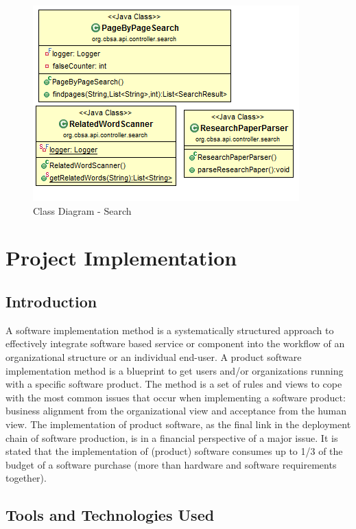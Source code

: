 \documentclass[oneside,a4paper,12pt]{report}
\begin{document}
{\begin{figure}[H]
\includegraphics{class-dig-search}
\caption{Class Diagram - Search}
\end{figure}



\chapter{Project Implementation}
\section{Introduction}
A software implementation method is a systematically structured approach to effectively integrate software based service or component into the workflow of an organizational structure or an individual end-user. A product software implementation method is a blueprint to get users and/or organizations running with a specific software product. The method is a set of rules and views to cope with the most common issues that occur when implementing a software product: business alignment from the organizational view and acceptance from the human view. The implementation of product software, as the final link in the deployment chain of software production, is in a financial perspective of a major issue. It is stated that the implementation of (product) software consumes up to 1/3 of the budget of a software purchase (more than hardware and software requirements together).

\section{Tools and Technologies Used}
}
\end{document}
